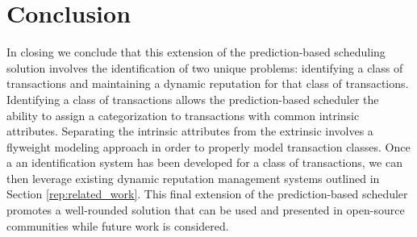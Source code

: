 \section{Conclusion}
\label{rep:conclusion}

In closing we conclude that this extension of the prediction-based scheduling solution involves the identification of two unique problems: identifying a class of transactions and maintaining a dynamic reputation for that class of transactions. Identifying a class of transactions allows the prediction-based scheduler the ability to assign a categorization to transactions with common intrinsic attributes. Separating the intrinsic attributes from the extrinsic involves a flyweight modeling approach in order to properly model transaction classes. Once a an identification system has been developed for a class of transactions, we can then leverage existing dynamic reputation management systems outlined in Section \ref{rep:related_work}. This final extension of the prediction-based scheduler promotes a well-rounded solution that can be used and presented in open-source communities while future work is considered.